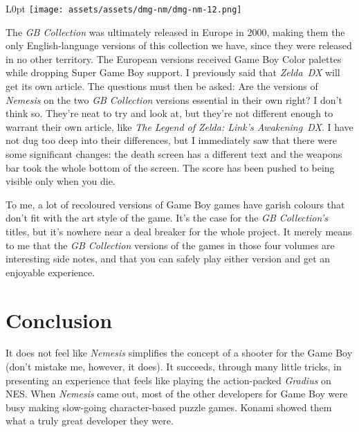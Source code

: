 \documentclass{book}
\let\oldcenter\center
\let\oldendcenter\endcenter
\renewenvironment{center}{\setlength\topsep{0pt}\oldcenter}{\oldendcenter}
\begin{document}
\begin{wrapfigure}{L}{0pt} \texttt{[image: assets/assets/dmg-nm/dmg-nm-12.png]}\end{wrapfigure}
The \emph{GB Collection} was ultimately released in Europe in 2000, making them the only English-language versions of this collection we have, since they were released in no other territory. The European versions received Game Boy Color palettes while dropping Super Game Boy support. I previously said that \emph{Zelda DX} will get its own article. The questions must then be asked: Are the versions of \emph{Nemesis} on the two \emph{GB Collection} versions essential in their own right? I don’t think so. They’re neat to try and look at, but they’re not different enough to warrant their own article, like \emph{The Legend of Zelda: Link’s Awakening DX}. I have not dug too deep into their differences, but I immediately saw that there were some significant changes: the death screen has a different text and the weapons bar took the whole bottom of the screen. The score has been pushed to being visible only when you die.

\begin{center}
\vspace{8pt}
\quad\vspace{4pt}
\end{center}

To me, a lot of recoloured versions of Game Boy games have garish colours that don’t fit with the art style of the game. It’s the case for the \emph{GB Collection’s} titles, but it’s nowhere near a deal breaker for the whole project. It merely means to me that the \emph{GB Collection} versions of the games in those four volumes are interesting side notes, and that you can safely play either version and get an enjoyable experience.

\FloatBarrier\needspace{5pt}\section*{Conclusion}\nopagebreak[4]

It does not feel like \emph{Nemesis} simplifies the concept of a shooter for the Game Boy (don’t mistake me, however, it does). It succeeds, through many little tricks, in presenting an experience that feels like playing the action-packed \emph{Gradius} on NES. When \emph{Nemesis} came out, most of the other developers for Game Boy were busy making slow-going character-based puzzle games. Konami showed them what a truly great developer they were.
\end{document}
